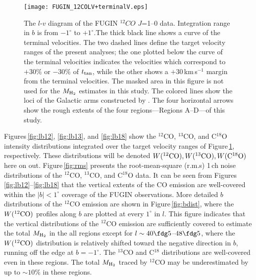 \documentclass[proof]{pasj01}
\begin{document}
\begin{figure}
 \begin{center}
  \texttt{[image: FUGIN\_12COLV+terminalV.eps]}
 \end{center}
 \caption{The $l$-$v$ diagram of the FUGIN $^{12}CO$ $J$=1--0 data. Integration range in $b$ is from $-1^\circ$ to $+1^\circ$.The thick black line shows a curve of the terminal velocities. The two dashed lines define the target velocity ranges of the present analyses; the one plotted below the curve of the terminal velocities indicates the velocities which correspond to $+30\%$ or $-30\%$ of $t_{\rm tan}$, while the other shows a $+30$\,km\,s$^{-1}$ margin from the terminal velocities. The masked area in this figure is not used for the $M_{\rm H_2}$ estimates in this study. The colored lines show the loci of the Galactic arms constructed by \citet{rei2016}. The four horizontal arrows show the rough extents of the four regions---Regions A--D---of this study. }\label{fig:lv}
\end{figure}



Figures\,\ref{fig:lb12}, \ref{fig:lb13}, and \ref{fig:lb18} show the $^{12}$CO, $^{13}$CO, and C$^{18}$O intensity distributions integrated over the target velocity ranges of Figure\,\ref{fig:lv}, respectively. These distributions will be denoted $W({\rm ^{12}CO}), W({\rm ^{13}CO}), W({\rm C^{18}O})$ here on out. 
Figure\,\ref{fig:rms} presents the root-mean-square (r.m.s) 1\,ch noise distributions of the $^{12}$CO, $^{13}$CO, and C$^{18}$O data.
It can be seen from Figures\,\ref{fig:lb12}--\ref{fig:lb18} that the vertical extents of the CO emission are well-covered within the $|b| < 1^\circ$ coverage of the FUGIN observations.
More detailed $b$ distributions of the $^{12}$CO emission are shown in Figure\,\ref{fig:bdist}, where the $W({\rm ^{12}CO})$ profiles along $b$ are plotted at every $1^\circ$ in $l$.
This figure indicates that the vertical distributions of the $^{12}$CO emission are sufficiently covered to estimate the total $M_{\rm H_2}$ in the all regions except for $l\sim40\fdg5$--$48\fdg5$, where the $W({\rm ^{12}CO})$ distribution is relatively shifted toward the negative direction in $b$, running off the edge at $b=-1^\circ$. 
The $^{13}$CO and C$^{18}$ distributions are well-covered even in these regions.
The total $M_{\rm H_2}$ traced by $^{12}$CO may be underestimated by up to $\sim10$\% in these regions.

\end{document}
